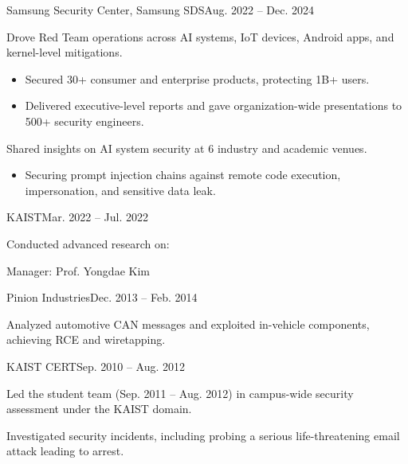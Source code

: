 \begin{timeitemize}{Samsung Security Center, Samsung SDS}{Aug. 2022 -- Dec. 2024}
    \item Drove Red Team operations across AI systems, IoT devices, Android apps, and kernel-level mitigations.
        \begin{itemize}[label=·]
        \item Secured 30+ consumer and enterprise products, protecting 1B+ users.
        \item Delivered executive-level reports and gave organization-wide presentations to 500+ security engineers.
        \end{itemize}
    \item Shared insights on AI system security at 6 industry and academic venues.
        \begin{itemize}[label=·]
        \item Securing prompt injection chains against remote code execution, impersonation, and sensitive data leak.
        \end{itemize}
\end{timeitemize}

\begin{timeitemize}{KAIST}{Mar. 2022 -- Jul. 2022}
    \item Conducted advanced research on:
    \item Manager: Prof. Yongdae Kim
\end{timeitemize}

\begin{timeitemize}{Pinion Industries}{Dec. 2013 -- Feb. 2014}
    \item Analyzed automotive CAN messages and exploited in-vehicle components, achieving RCE and wiretapping.
\end{timeitemize}

\begin{timeitemize}{KAIST CERT}{Sep. 2010 -- Aug. 2012}
    \item Led the student team (Sep. 2011 – Aug. 2012) in campus-wide security assessment under the KAIST domain.
    \item Investigated security incidents, including probing a serious life-threatening email attack leading to arrest.
\end{timeitemize}

